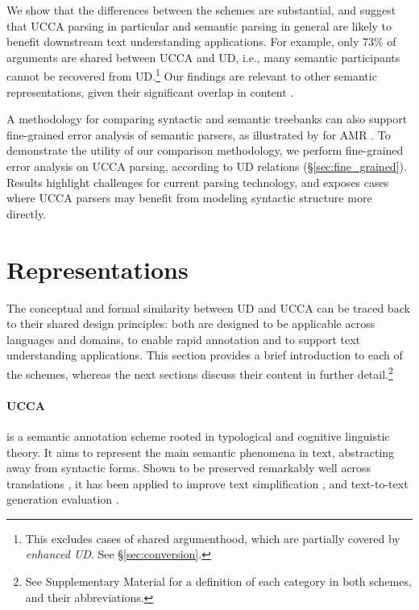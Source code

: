 \documentclass[11pt,a4paper]{article}
\begin{document}
  We show that the differences between the schemes are substantial, and suggest that
  UCCA parsing in particular and semantic parsing in general are likely to benefit
  downstream text understanding applications.
  For example, only 73\% of arguments are shared between UCCA and UD,
  i.e., many semantic participants cannot be recovered from UD.\footnote{This excludes cases of shared 
  argumenthood, which are partially covered by \textit{enhanced UD}. See \S\ref{sec:conversion}.}
  Our findings are relevant to other semantic representations, given their 
  significant overlap in content \cite{abend2017state}.
    
  
  A methodology for comparing syntactic and semantic treebanks can also support fine-grained error 
  analysis of semantic parsers, as illustrated by \citet{szubert2018structured} 
  for AMR \citep{banarescu2013abstract}.
  To demonstrate the utility of our comparison methodology,
  we perform fine-grained error analysis on UCCA parsing,
  according to UD relations (\S\ref{sec:fine_grained}).
  Results highlight challenges for current parsing technology,
  and exposes cases where UCCA parsers may benefit from modeling syntactic structure more directly.



\section{Representations}\label{sec:representations}

  The conceptual and formal similarity between UD and UCCA can be traced back
  to their shared design principles:
  both are designed to be applicable across languages and domains, 
  to enable rapid annotation and to support text understanding
  applications. This section provides a brief introduction to each of the schemes, whereas
  the next sections discuss their content in further
  detail.\footnote{See Supplementary Material for a definition of each category in both schemes,
  and their abbreviations.}
  


\paragraph{UCCA}\label{sec:ucca}
  is a semantic annotation scheme rooted in typological 
  and cognitive linguistic theory.
  It aims to represent the main semantic phenomena in text, abstracting away from syntactic forms.
  Shown to be preserved remarkably well across translations \citep{sulem2015conceptual}, it has been applied to
  improve text simplification \citep{sulem2018simple},
  and text-to-text generation evaluation \citep{birch2016hume,choshen2018usim,sulem2018samsa}.
\end{document}
